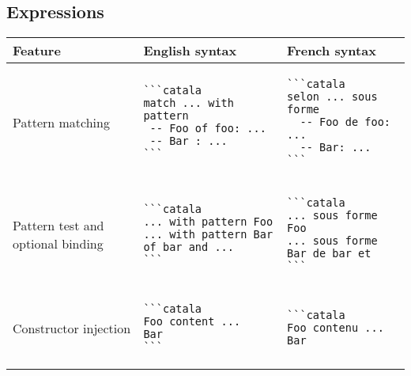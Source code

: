 \documentclass[a3paper,landscape]{article}
\begin{document}
\begin{multicols*}{2}
  \section*{Expressions}
  \begin{center}
    \begin{tabular}{p{}p{}p{}}
      \toprule
      Feature                           & English syntax & French syntax \\\midrule
      Pattern matching                  &
      \vspace*{-1.75em}
      \begin{verbatim}
```catala
match ... with pattern
 -- Foo of foo: ...
 -- Bar : ...
```
\end{verbatim}
      \vspace*{-1.75em}
                                        &
      \vspace*{-1.75em}
      \begin{verbatim}
```catala
selon ... sous forme
  -- Foo de foo: ...
  -- Bar: ...
```
\end{verbatim}
      \vspace*{-1.75em}
      \\
      Pattern test and optional binding &
      \vspace*{-1.75em}
      \begin{verbatim}
```catala
... with pattern Foo
... with pattern Bar of bar and ...
```
\end{verbatim}
      \vspace*{-1.75em}
                                        &
      \vspace*{-1.75em}
      \begin{verbatim}
```catala
... sous forme Foo
... sous forme Bar de bar et
```
\end{verbatim}
      \vspace*{-1.75em}
      \\
      Constructor injection             &
      \vspace*{-1.75em}
      \begin{verbatim}
```catala
Foo content ...       Bar
```
\end{verbatim}
      \vspace*{-1.75em}
                                        &
      \vspace*{-1.75em}
      \begin{verbatim}
```catala
Foo contenu ...       Bar

\end{verbatim}
\end{tabular}
\end{center}
\end{multicols*}
\end{document}
